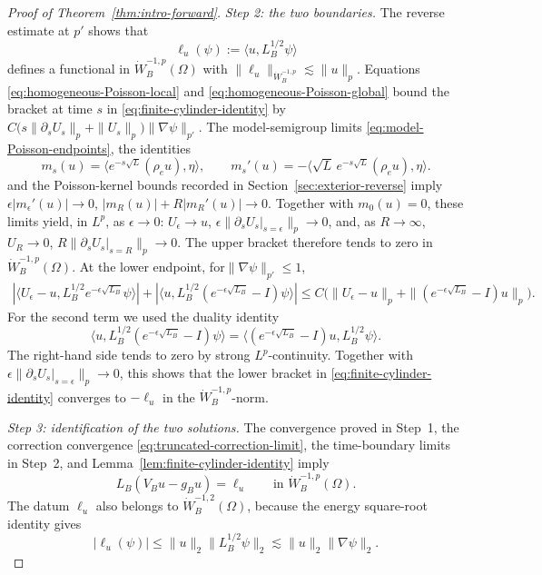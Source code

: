 \documentclass[12pt]{amsart}
\theoremstyle{remark}
\begin{document}
\begin{proof}[Proof of Theorem~\ref{thm:intro-forward}]
\emph{Step 2: the two boundaries.}
The reverse estimate at \(p'\) shows that
\[
 \ell_u(\psi):=\langle u,L_B^{1/2}\psi\rangle
\]
defines a functional in \(\dot W^{-1,p}_B(\Omega)\) with
\(\|\ell_u\|_{\dot W^{-1,p}_B}\lesssim\|u\|_p\).
Equations \eqref{eq:homogeneous-Poisson-local} and
\eqref{eq:homogeneous-Poisson-global} bound the bracket at time \(s\) in
\eqref{eq:finite-cylinder-identity} by $C\bigl(s\|\partial_sU_s\|_p+\|U_s\|_p\bigr)\|\nabla\psi\|_{p'}$. The model-semigroup limits \eqref{eq:model-Poisson-endpoints}, the identities
\[
 m_s(u)=\langle e^{-s\sqrt L}(\rho_eu),\eta\rangle,
 \qquad
 m_s'(u)=-\langle\sqrt L\,e^{-s\sqrt L}(\rho_eu),\eta\rangle.
\]
and the Poisson-kernel bounds recorded in
Section~\ref{sec:exterior-reverse}
imply $\epsilon|m_\epsilon'(u)|\longrightarrow0$, $|m_R(u)|+R|m_R'(u)|\longrightarrow0$. Together with \(m_0(u)=0\), these limits yield, in \(L^p\), as $\epsilon \to 0$: $U_\epsilon\to u$, $\epsilon\|\partial_sU_s|_{s=\epsilon}\|_p\to0$, and, as \(R\to\infty\), $U_R\to0$, $R\|\partial_sU_s|_{s=R}\|_p\to0$. The upper bracket therefore tends to zero in
\(\dot W^{-1,p}_B(\Omega)\).  At the lower endpoint, for\(\|\nabla\psi\|_{p'}\leq1\), 
\begin{align*}
 |\langle U_\epsilon-u,
       L_B^{1/2}e^{-\epsilon\sqrt{L_B}}\psi\rangle|
 +|\langle u,L_B^{1/2}(e^{-\epsilon\sqrt{L_B}}-I)\psi\rangle|\leq C\bigl(\|U_\epsilon-u\|_p
 +\|(e^{-\epsilon\sqrt{L_B}}-I)u\|_p\bigr).
\end{align*}
For the second term we used the duality identity
\[
 \langle u,L_B^{1/2}(e^{-\epsilon\sqrt{L_B}}-I)\psi\rangle
 =\langle(e^{-\epsilon\sqrt{L_B}}-I)u,L_B^{1/2}\psi\rangle.
\]
The right-hand side tends to zero by strong \(L^p\)-continuity.  Together
with \(\epsilon\|\partial_sU_s|_{s=\epsilon}\|_p\to0\), this shows that the lower
bracket in \eqref{eq:finite-cylinder-identity} converges to \(-\ell_u\)
in the \(\dot W^{-1,p}_B\)-norm.

\emph{Step 3: identification of the two solutions.}
The convergence proved in Step~1, the correction convergence
\eqref{eq:truncated-correction-limit}, the time-boundary limits in
Step~2, and Lemma~\ref{lem:finite-cylinder-identity} imply
\begin{equation}\label{eq:homogeneous-resolvent-identity}
 L_B(V_Bu-g_Bu)=\ell_u
 \qquad\text{in }\dot W^{-1,p}_B(\Omega).
\end{equation}
The datum \(\ell_u\) also belongs to \(\dot W^{-1,2}_B(\Omega)\), because
the energy square-root identity gives
\[
 |\ell_u(\psi)|
 \leq\|u\|_2\|L_B^{1/2}\psi\|_2
 \lesssim\|u\|_2\|\nabla\psi\|_2.
\]


\end{proof}
\end{document}
